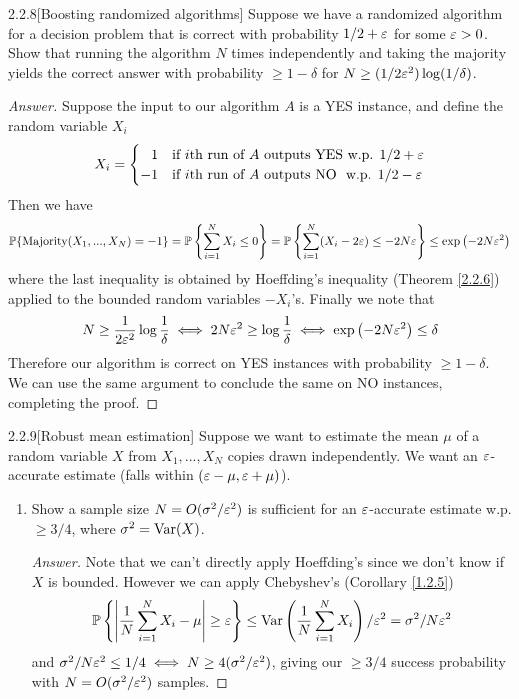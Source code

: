 {\begin{ex}{2.2.8}[Boosting randomized algorithms]\label{2.2.8}
Suppose we have a randomized algorithm for a decision problem that is correct with probability $1/2 + \varepsilon$ for some $\varepsilon>0$. Show that running the algorithm $N$ times independently and taking the majority yields the correct answer with probability $\geq 1 -\delta$ for $N\geq (1/2\varepsilon^2) \log (1/ \delta)$.
\end{ex}
\begin{proof}[Answer]
Suppose the input to our algorithm $A$ is a YES instance, and define the random variable $X_i$
\begin{align*}
    X_i =\begin{cases}
        \phantom{-}1 &\text{if $i$th run of $A$ outputs YES w.p. } 1/2 + \varepsilon \\
        -1 &\text{if $i$th run of $A$ outputs NO\phantom{ } w.p. } 1/2 - \varepsilon
    \end{cases}
\end{align*}
Then we have
\begin{align*}
    \mathbb{P} \{\text{Majority}(X_1,...,X_N) = -1 \} = \mathbb{P} \left\{\sum_{i=1}^N X_i \leq 0\right\} = \mathbb{P} \left\{\sum_{i=1}^N (X_i - 2\varepsilon) \leq -2N\varepsilon\right\} \leq \exp\left(-2N\varepsilon^2\right)
\end{align*}
where the last inequality is obtained by Hoeffding's inequality (Theorem \ref{2.2.6}) applied to the bounded random variables $-X_i$'s. Finally we note that 
\begin{align*}
    N \geq \frac 1 {2\varepsilon^2}\log \frac 1 \delta \iff 2N\varepsilon^2 \geq \log \frac 1 \delta \iff \exp\left(-2N\varepsilon^2\right) \leq \delta
\end{align*}
Therefore our algorithm is correct on YES instances with probability $\geq 1-\delta$. We can use the same argument to conclude the same on NO instances, completing the proof.
\end{proof}

\begin{ex}{2.2.9}[Robust mean estimation]\label{2.2.9}
Suppose we want to estimate the mean $\mu$ of a random variable $X$ from $X_1,...,X_N$ copies drawn independently. We want an $\varepsilon$-accurate estimate (falls within $(\varepsilon-\mu, \varepsilon+\mu)$).
\begin{enumerate}[label=(\alph*)]
\item Show a sample size $N = O(\sigma^2/\varepsilon^2)$ is sufficient for an $\varepsilon$-accurate estimate w.p. $\geq 3/4$, where $\sigma^2 = \text{Var}(X)$.
\begin{proof}[Answer]
Note that we can't directly apply Hoeffding's since we don't know if $X$ is bounded. However we can apply Chebyshev's (Corollary \ref{1.2.5})
\begin{align*}
    \mathbb{P} \left\{ \left|\frac1N\sum_{i=1}^N X_i - \mu \right| \geq \varepsilon\right\} \leq \text{Var}\left( \frac1N\sum_{i=1}^N X_i\right)/\varepsilon^2 = \sigma^2/N\varepsilon^2
\end{align*}
and $\sigma^2/N\varepsilon^2 \leq 1/4 \iff N \geq 4(\sigma^2/\varepsilon^2)$, giving our $\geq 3/4$ success probability with $N = O(\sigma^2/\varepsilon^2)$ samples.
\end{proof}


\end{enumerate}
\end{ex}}
